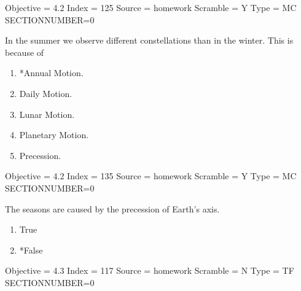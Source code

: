 \documentclass[11pt]{article}
\begin{document}
\begin{enumerate}
\begin{minipage}{\textwidth}
\begin{minipage}{\textwidth}
Objective = 4.2
Index = 125
Source = homework
Scramble = Y
Type = MC
SECTIONNUMBER=0
\end{minipage}
\end{minipage}
\vskip 0.20in

\begin{minipage}{\textwidth}
\begin{minipage}{\textwidth}
\item In the summer we observe different constellations than in the winter. This is because of \underline{\hspace{0.5in}}
\begin{multicols}{3}
\begin{enumerate} 
\setlength{\itemsep}{1pt} 
\setlength{\parskip}{0pt} 
\setlength{\parsep}{0pt}
\setlength{\multicolsep}{1pt} 
\item *Annual Motion.
\item Daily Motion.
\item Lunar Motion.
\item Planetary Motion.
\item Precession.
\end{enumerate} 
\vfill 
\end{multicols}

Objective = 4.2
Index = 135
Source = homework
Scramble = Y
Type = MC
SECTIONNUMBER=0
\end{minipage}
\end{minipage}
\vskip 0.20in

\begin{minipage}{\textwidth}
\begin{minipage}{\textwidth}
\item The seasons are caused by the precession of Earth's axis.
\begin{multicols}{3}
\begin{enumerate} 
\setlength{\itemsep}{1pt} 
\setlength{\parskip}{0pt} 
\setlength{\parsep}{0pt}
\setlength{\multicolsep}{1pt} 
\item True
\item *False
\end{enumerate} 
\vfill 
\end{multicols}

Objective = 4.3
Index = 117
Source = homework
Scramble = N
Type = TF
SECTIONNUMBER=0
\end{minipage}
\end{minipage}
\vskip 0.20in


\end{enumerate}
\end{document}
